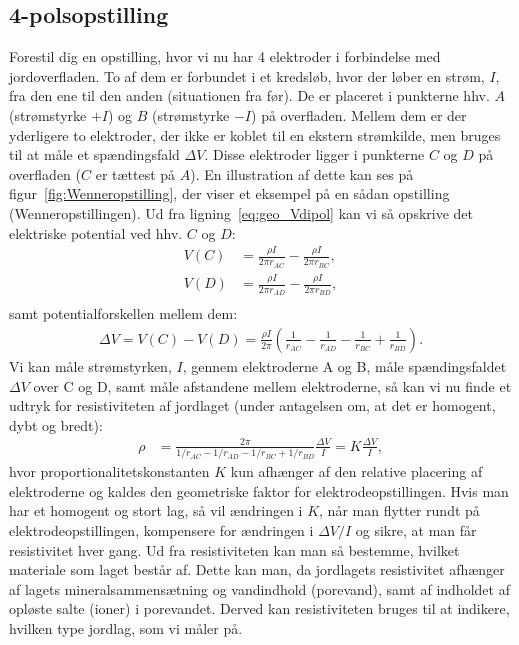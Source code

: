 \subsection{4-polsopstilling}\label{ssec:4-pols opstilling}
Forestil dig en opstilling, hvor vi nu har 4 elektroder i forbindelse med jordoverfladen. To af dem er forbundet i et kredsløb, hvor der løber en strøm, $I$, fra den ene til den anden (situationen fra før). De er placeret i punkterne hhv. $A$ (strømstyrke $+I$) og $B$ (strømstyrke $-I$) på overfladen. Mellem dem er der yderligere to elektroder, der ikke er koblet til en ekstern strømkilde, men bruges til at måle et spændingsfald $\Delta V$. Disse elektroder ligger i punkterne $C$ og $D$ på overfladen ($C$ er tættest på $A$). En illustration af dette kan ses på figur~\ref{fig:Wenneropstilling}, der viser et eksempel på en sådan opstilling (Wenneropstillingen). Ud fra ligning~\eqref{eq:geo_Vdipol} kan vi så opskrive det elektriske potential ved hhv. $C$ og $D$:
%
\begin{align}
    V(C) &= \frac{\rho I}{2\pi r_{AC}} - \frac{\rho I}{2\pi r_{BC}}, \\
    V(D) &= \frac{\rho I}{2\pi r_{AD}} - \frac{\rho I}{2\pi r_{BD}}, \\
\end{align}
%
samt potentialforskellen mellem dem:
%
\begin{align}
    \Delta V = V(C) - V(D) = \frac{\rho I}{2\pi}\left( \frac{1}{r_{AC}} - \frac{1}{r_{AD}} - \frac{1}{r_{BC}} + \frac{1}{r_{BD}} \right).
\end{align}
%
Vi kan måle strømstyrken, $I$, gennem elektroderne A og B, måle spændingsfaldet $\Delta V$ over C og D, samt måle afstandene mellem elektroderne, så kan vi nu finde et udtryk for resistiviteten af jordlaget (under antagelsen om, at det er homogent, dybt og bredt):
\begin{align}
    \rho &= \frac{2\pi}{1/r_{AC} - 1/r_{AD} - 1/r_{BC} + 1/r_{BD}} \frac{\Delta V}{I} = K \frac{\Delta V}{I},\label{eq:geo_rho}
\end{align}
hvor proportionalitetskonstanten $K$ kun afhænger af den relative placering af elektroderne og kaldes den geometriske faktor for elektrodeopstillingen. Hvis man har et homogent og stort lag, så vil ændringen i $K$, når man flytter rundt på elektrodeopstillingen, kompensere for ændringen i $\Delta V/I$ og sikre, at man får resistivitet hver gang. Ud fra resistiviteten kan man så bestemme, hvilket materiale som laget består af. Dette kan man, da jordlagets resistivitet afhænger af lagets mineralsammensætning og vandindhold (porevand), samt af indholdet af opløste salte (ioner) i porevandet. Derved kan resistiviteten bruges til at indikere, hvilken type jordlag, som vi måler på.
